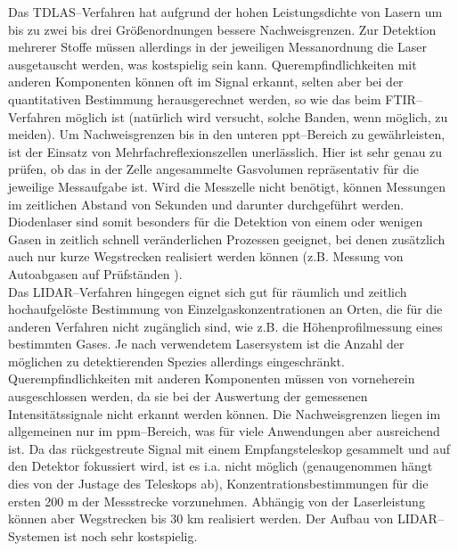 Das TDLAS--Verfahren hat aufgrund der hohen Leistungsdichte von
Lasern um bis zu zwei bis drei Grö{\ss}enordnungen bessere
Nachweisgrenzen. Zur Detektion mehrerer Stoffe müssen allerdings
in der jeweiligen Messanordnung die Laser ausgetauscht werden, was
kostspielig sein kann. Querempfindlichkeiten mit anderen
Komponenten können oft im Signal erkannt, selten aber bei der
quantitativen Bestimmung herausgerechnet werden, so wie das beim
FTIR--Verfahren möglich ist (natürlich wird versucht, solche
Banden, wenn möglich, zu meiden). Um Nachweisgrenzen bis in den
unteren ppt--Bereich zu gewährleisten, ist der Einsatz von
Mehrfachreflexionszellen unerlässlich. Hier ist sehr genau zu
prüfen, ob das in der Zelle angesammelte Gasvolumen repräsentativ
für die jeweilige Messaufgabe ist. Wird die Messzelle nicht
benötigt, können Messungen im zeitlichen Abstand von Sekunden und
darunter durchgeführt werden. Diodenlaser sind somit besonders für
die Detektion von einem oder wenigen Gasen in zeitlich schnell
veränderlichen Prozessen geeignet, bei denen zusätzlich auch nur
kurze Wegstrecken realisiert werden können (z.B. Messung von
Autoabgasen auf Prüfständen \cite{hirschbergerip}).\\

Das LIDAR--Verfahren hingegen eignet sich gut für räumlich und
zeitlich hochaufgelöste Bestimmung von Einzelgaskonzentrationen an
Orten, die für die anderen Verfahren nicht zugänglich sind, wie
z.B. die Höhenprofilmessung eines bestimmten Gases. Je nach
verwendetem Lasersystem ist die Anzahl der möglichen zu
detektierenden Spezies allerdings eingeschränkt.
Querempfindlichkeiten mit anderen Komponenten müssen von
vorneherein ausgeschlossen werden, da sie bei der Auswertung der
gemessenen Intensitätssignale nicht erkannt werden können. Die
Nachweisgrenzen liegen im allgemeinen nur im ppm--Bereich, was für
viele Anwendungen aber ausreichend ist. Da das rückgestreute
Signal mit einem Empfangsteleskop gesammelt und auf den Detektor
fokussiert wird, ist es i.a. nicht möglich (genaugenommen hängt
dies von der Justage des Teleskops ab), Konzentrationsbestimmungen
für die ersten 200 m der Messstrecke vorzunehmen. Abhängig von der
Laserleistung können aber Wegstrecken bis 30 km realisiert werden.
Der Aufbau von LIDAR--Systemen ist noch sehr kostspielig.\\

\cleardoublepage
